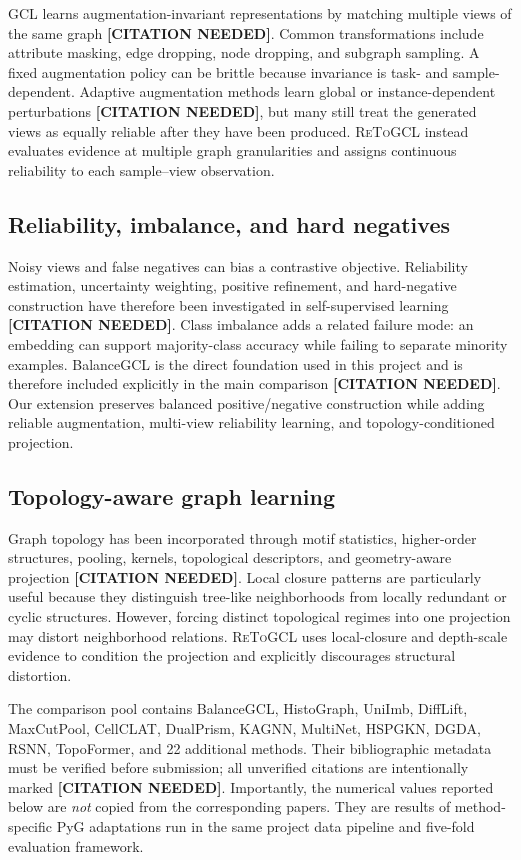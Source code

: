 \documentclass[10pt,twocolumn]{article}
\newcommand{\method}{\textsc{ReToGCL}}
\newcommand{\citeneeded}{\textbf{[CITATION NEEDED]}}
\begin{document}
GCL learns augmentation-invariant representations by matching multiple views of the same graph \citeneeded. Common transformations include attribute masking, edge dropping, node dropping, and subgraph sampling. A fixed augmentation policy can be brittle because invariance is task- and sample-dependent. Adaptive augmentation methods learn global or instance-dependent perturbations \citeneeded, but many still treat the generated views as equally reliable after they have been produced. \method{} instead evaluates evidence at multiple graph granularities and assigns continuous reliability to each sample--view observation.

\subsection{Reliability, imbalance, and hard negatives}

Noisy views and false negatives can bias a contrastive objective. Reliability estimation, uncertainty weighting, positive refinement, and hard-negative construction have therefore been investigated in self-supervised learning \citeneeded. Class imbalance adds a related failure mode: an embedding can support majority-class accuracy while failing to separate minority examples. BalanceGCL is the direct foundation used in this project and is therefore included explicitly in the main comparison \citeneeded. Our extension preserves balanced positive/negative construction while adding reliable augmentation, multi-view reliability learning, and topology-conditioned projection.

\subsection{Topology-aware graph learning}

Graph topology has been incorporated through motif statistics, higher-order structures, pooling, kernels, topological descriptors, and geometry-aware projection \citeneeded. Local closure patterns are particularly useful because they distinguish tree-like neighborhoods from locally redundant or cyclic structures. However, forcing distinct topological regimes into one projection may distort neighborhood relations. \method{} uses local-closure and depth-scale evidence to condition the projection and explicitly discourages structural distortion.

The comparison pool contains BalanceGCL, HistoGraph, UniImb, DiffLift, MaxCutPool, CellCLAT, DualPrism, KAGNN, MultiNet, HSPGKN, DGDA, RSNN, TopoFormer, and 22 additional methods. Their bibliographic metadata must be verified before submission; all unverified citations are intentionally marked \citeneeded. Importantly, the numerical values reported below are \emph{not} copied from the corresponding papers. They are results of method-specific PyG adaptations run in the same project data pipeline and five-fold evaluation framework.
\end{document}
